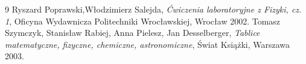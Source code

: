 \documentclass{article}
\begin{document}
\vfill
\normalsize
{}
\begin{thebibliography}{9}
    Ryszard Poprawski,Włodzimierz Salejda, \textit{Ćwiczenia laboratoryjne z Fizyki, cz. 1}, Oficyna Wydawnicza Politechniki Wrocławskiej, Wrocław 2002.
    Tomasz Szymczyk, Stanisław Rabiej, Anna Pielesz, Jan Desselberger, \textit{Tablice matematyczne, fizyczne, chemiczne,  astronomiczne}, Świat Książki, Warszawa 2003.
    
\end{thebibliography}
\end{document}
